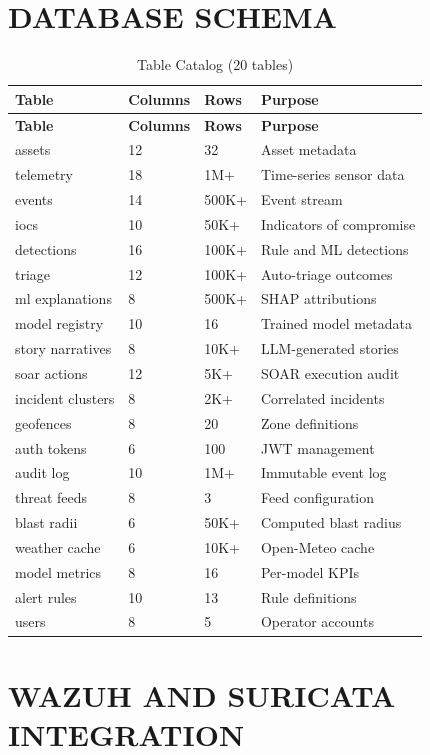 \documentclass[12pt,a4paper]{amritareport}
\begin{document}
\section{DATABASE SCHEMA}

\begin{longtable}{@{}P{3.5cm}P{1.9cm}P{1.5cm}P{6.2cm}@{}}
\caption{Table Catalog (20 tables)}\label{tab:tables}\\
\toprule
\textbf{Table} & \textbf{Columns} & \textbf{Rows} & \textbf{Purpose} \\
\midrule
\endfirsthead
\toprule
\textbf{Table} & \textbf{Columns} & \textbf{Rows} & \textbf{Purpose} \\
\midrule
\endhead
assets & 12 & 32 & Asset metadata \\
telemetry & 18 & 1M+ & Time-series sensor data \\
events & 14 & 500K+ & Event stream \\
iocs & 10 & 50K+ & Indicators of compromise \\
detections & 16 & 100K+ & Rule and ML detections \\
triage & 12 & 100K+ & Auto-triage outcomes \\
ml explanations & 8 & 500K+ & SHAP attributions \\
model registry & 10 & 16 & Trained model metadata \\
story narratives & 8 & 10K+ & LLM-generated stories \\
soar actions & 12 & 5K+ & SOAR execution audit \\
incident clusters & 8 & 2K+ & Correlated incidents \\
geofences & 8 & 20 & Zone definitions \\
auth tokens & 6 & 100 & JWT management \\
audit log & 10 & 1M+ & Immutable event log \\
threat feeds & 8 & 3 & Feed configuration \\
blast radii & 6 & 50K+ & Computed blast radius \\
weather cache & 6 & 10K+ & Open-Meteo cache \\
model metrics & 8 & 16 & Per-model KPIs \\
alert rules & 10 & 13 & Rule definitions \\
users & 8 & 5 & Operator accounts \\
\bottomrule
\end{longtable}

\section{WAZUH AND SURICATA INTEGRATION}
\end{document}
